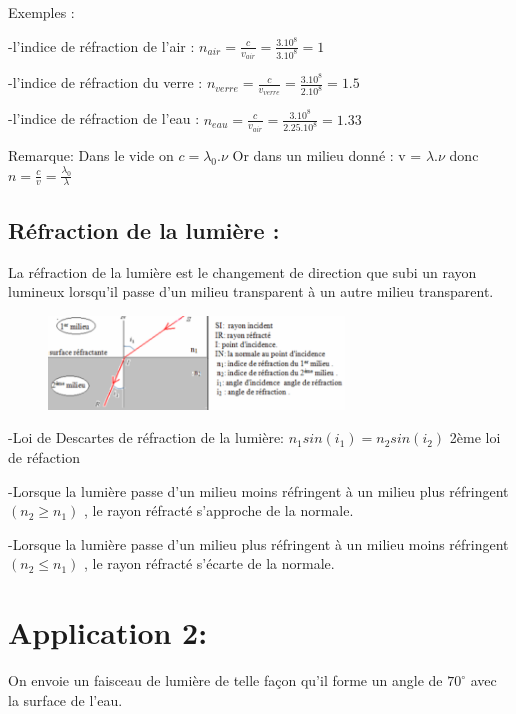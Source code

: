 \documentclass[12pt]{article}
\begin{document}
Exemples : 

-l'indice de réfraction de l'air : $n_{air} = \frac{c}{v_{air}} = \frac{3.10^8}{3.10^8} = 1$

-l'indice de réfraction du verre : $n_{verre} = \frac{c}{v_{verre}} = \frac{3.10^8}{2.10^8} = 1.5$

-l'indice de réfraction de l'eau : $n_{eau} = \frac{c}{v_{air}} = \frac{3.10^8}{2.25.10^8} = 1.33$
\begin{tcolorbox}
	Remarque: Dans le vide on $c = \lambda_0.\nu$ Or dans un milieu donné : v = $\lambda.\nu$ donc $n = \frac{c}{v} = \frac{\lambda_0}{\lambda}$
\end{tcolorbox}

\subsection{Réfraction de la lumière :}
La réfraction de la lumière est le changement de direction que subi un rayon lumineux lorsqu'il passe d'un milieu transparent à un autre milieu
transparent.

\begin{figure}[h]
	\begin{center}

	\vspace{-0.5cm}
		\includegraphics[width=0.7\textwidth]{./img/OLrefraction.png}
	\end{center}

	\vspace{-0.9cm}
\end{figure}
-Loi de Descartes de réfraction de la lumière: $n_1 sin(i_1) = n_2 sin(i_2)$ 2ème loi de réfaction

-Lorsque la lumière passe d'un milieu moins réfringent à un milieu plus réfringent $(n_2 \geq n_1)$ , le rayon réfracté s'approche de la normale.

-Lorsque la lumière passe d'un milieu plus réfringent à un milieu moins réfringent $(n_2 \leq n_1)$ , le rayon réfracté s'écarte de la normale.

\section*{Application 2: }
On envoie un faisceau de lumière de telle façon qu'il forme un angle de $70^{\circ}$ avec la surface de l'eau.
\end{document}
